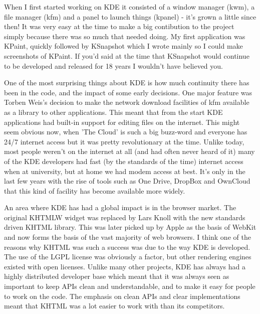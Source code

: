 ﻿


When I first started working on KDE it consisted of a window manager (kwm), a file manager (kfm) and a panel to launch things (kpanel) - it's grown a little since then! It was very easy at the time to make a big contibution to the project simply because there was so much that needed doing. My first application was KPaint, quickly followed by KSnapshot which I wrote mainly so I could make screenshots of KPaint. If you'd said at the time that KSnapshot would continue to be developed and released for 18 years I wouldn't have believed you.

One of the most surprising things about KDE is how much continuity there has been in the code, and the impact of some early decisions. One major feature was Torben Weis's decision to make the network download facilities of kfm available as a library to other applications. This meant that from the start KDE applications had built-in support for editing files on the internet. This might seem obvious now, when 'The Cloud' is such a big buzz-word and everyone has 24/7 internet access but it was pretty revolutionary at the time. Unlike today, most people weren't on the internet at all (and had often never heard of it) many of the KDE developers had fast (by the standards of the time) internet access when at university, but at home we had modem access at best. It's only in the last few years with the rise of tools such as One Drive, DropBox and OwnCloud that this kind of facility has become available more widely.

An area where KDE has had a global impact is in the browser market. The original KHTMLW widget was replaced by Lars Knoll with the new standards driven KHTML library. This was later picked up by Apple as the basis of WebKit and now forms the basis of the vast majority of web browsers. I think one of the reasons why KHTML was such a success was due to the way KDE is developed. The use of the LGPL license was obviously a factor, but other rendering engines existed with open licenses. Unlike many other projects, KDE has always had a highly distributed developer base which meant that it was always seen as important to keep APIs clean and understandable, and to make it easy for people to work on the code. The emphasis on clean APIs and clear implementations meant that KHTML was a lot easier to work with than its competitors.

